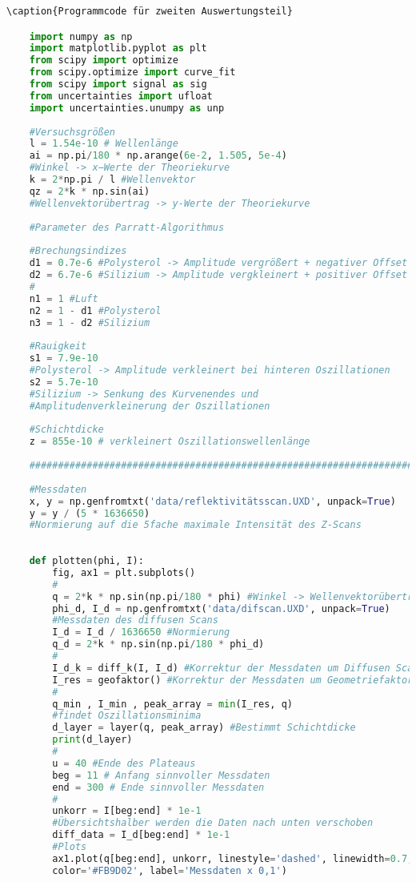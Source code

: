 \begin{lstlisting}[language=Python]
    \caption{Programmcode für zweiten Auswertungsteil}

    import numpy as np
    import matplotlib.pyplot as plt
    from scipy import optimize
    from scipy.optimize import curve_fit
    from scipy import signal as sig
    from uncertainties import ufloat
    import uncertainties.unumpy as unp
    
    #Versuchsgrößen
    l = 1.54e-10 # Wellenlänge
    ai = np.pi/180 * np.arange(6e-2, 1.505, 5e-4) 
    #Winkel -> x−Werte der Theoriekurve
    k = 2*np.pi / l #Wellenvektor
    qz = 2*k * np.sin(ai) 
    #Wellenvektorübertrag -> y-Werte der Theoriekurve
    
    #Parameter des Parratt-Algorithmus
    
    #Brechungsindizes
    d1 = 0.7e-6 #Polysterol -> Amplitude vergrößert + negativer Offset
    d2 = 6.7e-6 #Silizium -> Amplitude vergkleinert + positiver Offset
    #
    n1 = 1 #Luft
    n2 = 1 - d1 #Polysterol
    n3 = 1 - d2 #Silizium
    
    #Rauigkeit
    s1 = 7.9e-10 
    #Polysterol -> Amplitude verkleinert bei hinteren Oszillationen
    s2 = 5.7e-10 
    #Silizium -> Senkung des Kurvenendes und 
    #Amplitudenverkleinerung der Oszillationen
    
    #Schichtdicke
    z = 855e-10 # verkleinert Oszillationswellenlänge
    
    #####################################################################
    
    #Messdaten
    x, y = np.genfromtxt('data/reflektivitätsscan.UXD', unpack=True)
    y = y / (5 * 1636650) 
    #Normierung auf die 5fache maximale Intensität des Z-Scans
    
    
    def plotten(phi, I):
        fig, ax1 = plt.subplots()
        #
        q = 2*k * np.sin(np.pi/180 * phi) #Winkel -> Wellenvektorübertrag
        phi_d, I_d = np.genfromtxt('data/difscan.UXD', unpack=True) 
        #Messdaten des diffusen Scans
        I_d = I_d / 1636650 #Normierung
        q_d = 2*k * np.sin(np.pi/180 * phi_d) 
        #
        I_d_k = diff_k(I, I_d) #Korrektur der Messdaten um Diffusen Scan
        I_res = geofaktor() #Korrektur der Messdaten um Geometriefaktor
        #
        q_min , I_min , peak_array = min(I_res, q) 
        #findet Oszillationsminima
        d_layer = layer(q, peak_array) #Bestimmt Schichtdicke
        print(d_layer)
        #
        u = 40 #Ende des Plateaus
        beg = 11 # Anfang sinnvoller Messdaten
        end = 300 # Ende sinnvoller Messdaten
        #
        unkorr = I[beg:end] * 1e-1 
        #Übersichtshalber werden die Daten nach unten verschoben
        diff_data = I_d[beg:end] * 1e-1
        #Plots
        ax1.plot(q[beg:end], unkorr, linestyle='dashed', linewidth=0.7, 
        color='#FB9D02', label='Messdaten x 0,1')


\end{lstlisting}

